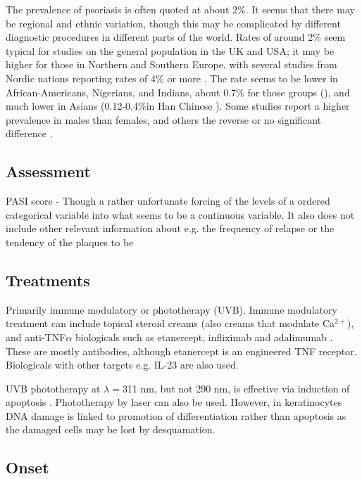 \documentclass[a4paper,10pt]{report}
\begin{document}
The prevalence of psoriasis is often quoted at about 2\%. It seems 
that there may be regional and ethnic variation, though this may be complicated
by different diagnostic procedures in different parts of the world. Rates of around 2\% seem typical for studies on the general population in the UK and USA; it may be higher for those in Northern and Southern Europe, with several studies from Nordic nations reporting rates of 4\% or more \cite{parisi2013global}.  
The rate seems to be lower in African-Americans, Nigerians, and Indians, about 0.7\% for those groups (\cite{parisi2013global,christophers2001psoriasis}), and much lower in Asians (0.12-0.4\%in Han Chinese \cite{zhang2002genetic,christophers2001psoriasis}). Some studies report a higher prevalence in males than females, and others the reverse or no significant difference \cite{parisi2013global}.  

\subsection{Assessment}

PASI score - 
Though a rather unfortunate forcing of the levels of a ordered categorical variable into what seems to be a continuous variable. It also does not include other relevant information about e.g. the frequency of relapse or the tendency of the plaques to be 


\subsection{Treatments}

Primarily immune modulatory or phototherapy (UVB). Immune modulatory treatment can include topical steroid creams (also creams that modulate Ca$^{2+}$), and anti-TNF$\alpha$ biologicals such as etanercept, infliximab and adalimumab \cite{kircik2009anti}. These are mostly antibodies, although etanercept is an engineered TNF receptor. Biologicals with other targets e.g. IL-23 are also used.


UVB phototherapy at $\lambda=$311 nm, but not 290 nm, is effective via induction of apoptosis \cite{weatherhead2011keratinocyte}. Phototherapy by laser can also be used. However, in keratinocytes  DNA damage is linked to promotion of differentiation rather than apoptosis as the damaged cells may be lost by desquamation\cite{freije2014inactivation,gandarillas2000normal}.

\subsection{Onset}
\end{document}
